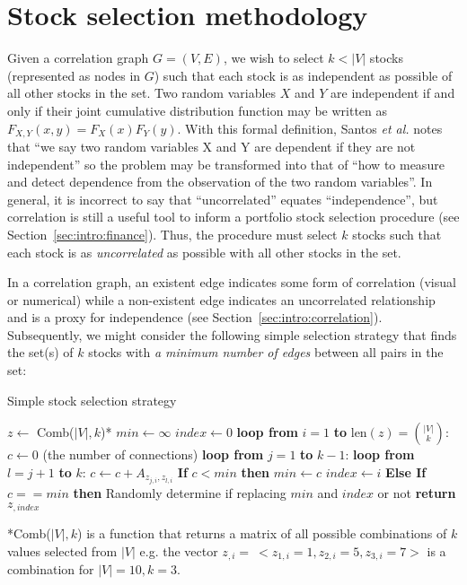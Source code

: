 \section{Stock selection methodology}
\label{sec:usage:stockselection}

Given a correlation graph $G=(V,E)$, we wish to select $k < |V|$ stocks 
(represented as nodes in $G$) such that each stock is as independent as 
possible of all other stocks in the set. Two random variables $X$ and $Y$ are 
independent if and only if their 
joint cumulative distribution function may be written as 
$F_{X,Y}(x,y)=F_X(x)F_Y(y)$. With this formal definition, Santos \textit{et 
al.} notes that ``we say two random variables X and Y are dependent if they
are not independent'' so the problem may be transformed into that of ``how to 
measure and detect dependence from the observation of the two random 
variables''\cite{santos2013}. In 
general, it is incorrect to say that ``uncorrelated'' equates ``independence'', 
but correlation is still a useful tool to inform a portfolio stock selection 
procedure (see Section~\ref{sec:intro:finance}). Thus, the procedure must 
select $k$ stocks such that each stock is as \textit{uncorrelated} as 
possible with all other stocks in the set.

In a correlation graph, an existent edge indicates some form of correlation 
(visual or numerical) while a non-existent edge indicates an uncorrelated 
relationship and is a proxy for independence 
(see Section~\ref{sec:intro:correlation}). Subsequently, we might consider the 
following simple 
selection strategy that finds the set(s) of $k$ stocks with \textit{a minimum 
number of edges} between all pairs in the set:

\tablespacing
\begin{algorithm}[H]
	\caption{Simple stock selection strategy}\label{alg:usage:stockselection1}
	\begin{algorithmic}[1]
		\State $z \gets$ Comb($|V|,k$)*
		\State $min \gets \infty$
		\State $index \gets 0$
		\State \textbf{loop from} $i=1$ \textbf{to} $\text{len}(z) = 
		{|V| \choose k}$:
		\State \indent $c \gets 0$ (the number of connections)
		\State \indent \textbf{loop from} $j = 1$ \textbf{to} $k-1$:
		\State \indent \indent \textbf{loop from} $l=j+1$ \textbf{to} $k$:
		\State \indent \indent \indent $c \gets c+A_{z_{j,i},z_{l,i}}$
		\State \indent \textbf{If} $c < min$ \textbf{then}
		\State \indent \indent $min \gets c$
		\State \indent \indent $index \gets i$
		\State \indent \textbf{Else If} $c == min$ \textbf{then}
		\State \indent \indent Randomly determine if replacing $min$ and 
		$index$ or not
		\State \textbf{return} $z_{,index}$
		\EndProcedure
	\end{algorithmic}
	*Comb($|V|,k$) is a function that returns a matrix of all possible 
	combinations of $k$ values selected from $|V|$ e.g. the vector $z_{,i}= \ 
	<z_{1,i} = 1, z_{2,i} = 5, z_{3,i} = 7>$ is a combination for $|V|=10,k=3$.
\end{algorithm}
\bodyspacing

